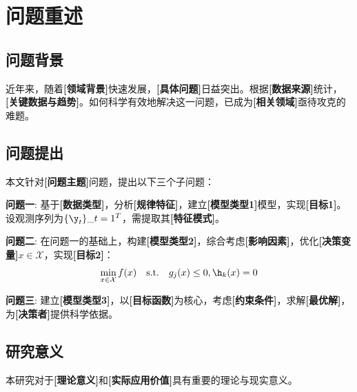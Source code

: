 \newpage
\section{问题重述}

\subsection{问题背景}
近年来，随着\textbf{[领域背景]}快速发展，\textbf{[具体问题]}日益突出。根据\textbf{[数据来源]}统计，\textbf{[关键数据与趋势]}。如何科学有效地解决这一问题，已成为\textbf{[相关领域]}亟待攻克的难题。

\subsection{问题提出}
本文针对\textbf{[问题主题]}问题，提出以下三个子问题：

\textbf{问题一}: 基于\textbf{[数据类型]}，分析\textbf{[规律特征]}，建立\textbf{[模型类型1]}模型，实现\textbf{[目标1]}。设观测序列为$\{\y_t\}\_{t=1}^T$，需提取其\textbf{[特征模式]}。

\textbf{问题二}: 在问题一的基础上，构建\textbf{[模型类型2]}，综合考虑\textbf{[影响因素]}，优化\textbf{[决策变量]}$x \in \mathcal{X}$，实现\textbf{[目标2]}：
$$\min_{x \in \mathcal{X}} f(x)\quad\text{s.t.}\quad g_j(x) \leq 0, \h_k(x) = 0$$

\textbf{问题三}: 建立\textbf{[模型类型3]}，以\textbf{[目标函数]}为核心，考虑\textbf{[约束条件]}，求解\textbf{[最优解]}，为\textbf{[决策者]}提供科学依据。

\subsection{研究意义}
本研究对于\textbf{[理论意义]}和\textbf{[实际应用价值]}具有重要的理论与现实意义。
